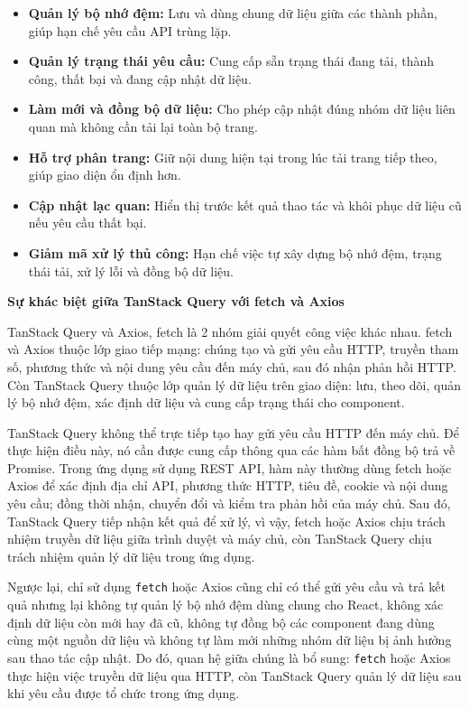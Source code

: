\begin{itemize}
    \item \textbf{Quản lý bộ nhớ đệm:} Lưu và dùng chung dữ liệu giữa các thành phần, giúp hạn chế yêu cầu API trùng lặp.

    \item \textbf{Quản lý trạng thái yêu cầu:} Cung cấp sẵn trạng thái đang tải, thành công, thất bại và đang cập nhật dữ liệu.

    \item \textbf{Làm mới và đồng bộ dữ liệu:} Cho phép cập nhật đúng nhóm dữ liệu liên quan mà không cần tải lại toàn bộ trang.

    \item \textbf{Hỗ trợ phân trang:} Giữ nội dung hiện tại trong lúc tải trang tiếp theo, giúp giao diện ổn định hơn.

    \item \textbf{Cập nhật lạc quan:} Hiển thị trước kết quả thao tác và khôi phục dữ liệu cũ nếu yêu cầu thất bại.

    \item \textbf{Giảm mã xử lý thủ công:} Hạn chế việc tự xây dựng bộ nhớ đệm, trạng thái tải, xử lý lỗi và đồng bộ dữ liệu.
\end{itemize}
\medskip
\noindent\textbf{Sự khác biệt giữa TanStack Query với fetch và Axios}
\medskip

TanStack Query và Axios, fetch là 2 nhóm giải quyết công việc khác nhau. fetch và Axios thuộc lớp giao tiếp mạng: chúng tạo và gửi yêu cầu HTTP, truyền tham số, phương thức và nội dung yêu cầu đến máy chủ, sau đó nhận phản hồi HTTP. Còn TanStack Query thuộc lớp quản lý dữ liệu trên giao diện: lưu, theo dõi, quản lý bộ nhớ đệm, xác định dữ liệu và cung cấp trạng thái cho component.

TanStack Query không thể trực tiếp tạo hay gửi yêu cầu HTTP đến máy chủ. Để thực hiện điều này, nó cần được cung cấp thông qua các hàm bất đồng bộ trả về Promise. Trong ứng dụng sử dụng REST API, hàm này thường dùng fetch hoặc Axios để xác định địa chỉ API, phương thức HTTP, tiêu đề, cookie và nội dung yêu cầu; đồng thời nhận, chuyển đổi và kiểm tra phản hồi của máy chủ. Sau đó, TanStack Query tiếp nhận kết quả để xử lý, vì vậy, fetch hoặc Axios chịu trách nhiệm truyền dữ liệu giữa trình duyệt và máy chủ, còn TanStack Query chịu trách nhiệm quản lý dữ liệu trong ứng dụng.

Ngược lại, chỉ sử dụng \texttt{fetch} hoặc Axios cũng chỉ có thể gửi yêu cầu và trả kết quả nhưng lại không tự quản lý bộ nhớ đệm dùng chung cho React, không xác định dữ liệu còn mới hay đã cũ, không tự đồng bộ các component đang dùng cùng một nguồn dữ liệu và không tự làm mới những nhóm dữ liệu bị ảnh hưởng sau thao tác cập nhật. Do đó, quan hệ giữa chúng là bổ sung: \texttt{fetch} hoặc Axios thực hiện việc truyền dữ liệu qua HTTP, còn TanStack Query quản lý dữ liệu sau khi yêu cầu được tổ chức trong ứng dụng.

